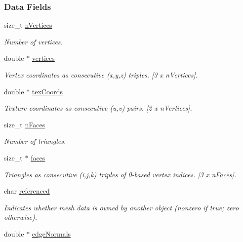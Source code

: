 \subsubsection*{Data Fields}
\begin{DoxyCompactItemize}
\item 
size\-\_\-t \hyperlink{structhm_tri_mesh_aad9ed5da071bc7451fa5f5aeac7c1814}{n\-Vertices}
\begin{DoxyCompactList}\small\item\em Number of vertices. \end{DoxyCompactList}\item 
double $\ast$ \hyperlink{structhm_tri_mesh_a7374e0ae5c0af9c7c42f1293643c691e}{vertices}
\begin{DoxyCompactList}\small\item\em Vertex coordinates as consecutive (x,y,z) triples. \mbox{[}3 x n\-Vertices\mbox{]}. \end{DoxyCompactList}\item 
double $\ast$ \hyperlink{structhm_tri_mesh_a69706f0bd58d8a3dbbb6c7331ca795c4}{tex\-Coords}
\begin{DoxyCompactList}\small\item\em Texture coordinates as consecutive (u,v) pairs. \mbox{[}2 x n\-Vertices\mbox{]}. \end{DoxyCompactList}\item 
size\-\_\-t \hyperlink{structhm_tri_mesh_a38de205b6938c9e0db72ac866a803be3}{n\-Faces}
\begin{DoxyCompactList}\small\item\em Number of triangles. \end{DoxyCompactList}\item 
size\-\_\-t $\ast$ \hyperlink{structhm_tri_mesh_ac0ddc0ca3b34698286793c9336af359d}{faces}
\begin{DoxyCompactList}\small\item\em Triangles as consecutive (i,j,k) triples of 0-\/based vertex indices. \mbox{[}3 x n\-Faces\mbox{]}. \end{DoxyCompactList}\item 
char \hyperlink{structhm_tri_mesh_a5f56e97a848fcd2451e252052138215d}{referenced}
\begin{DoxyCompactList}\small\item\em Indicates whether mesh data is owned by another object (nonzero if true; zero otherwise). \end{DoxyCompactList}\item 
double $\ast$ \hyperlink{structhm_tri_mesh_ab77958f936a48f87b041284aa8a8127f}{edge\-Normals}

\end{DoxyCompactItemize}
